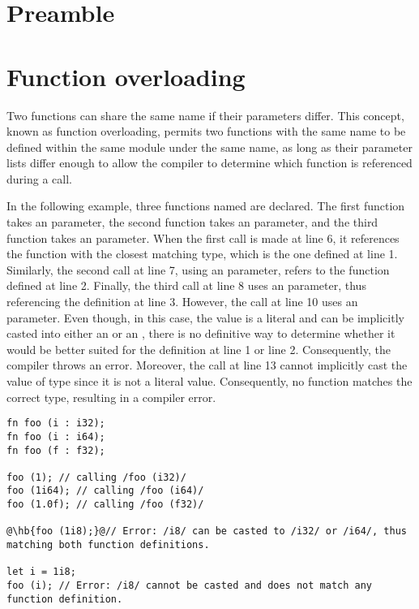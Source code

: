 \section{Preamble}

\section{Function overloading}
\label{sec:function_overloading}

Two functions can share the same name if their parameters differ. This concept,
known as function overloading, permits two functions with the same name to be
defined within the same module under the same name, as long as their parameter
lists differ enough to allow the compiler to determine which function is
referenced during a call.

In the following example, three functions named  are declared. The
first function takes an  parameter, the second function takes an
 parameter, and the third function takes an  parameter.
When the first call is made at line 6, it references the function with the
closest matching type, which is the one defined at line 1. Similarly, the second
call at line 7, using an  parameter, refers to the function defined
at line 2. Finally, the third call at line 8 uses an  parameter, thus
referencing the definition at line 3. However, the call at line 10 uses an
 parameter. Even though, in this case, the value is a literal and can
be implicitly casted into either an  or an , there is no
definitive way to determine whether it would be better suited for the definition
at line 1 or line 2. Consequently, the compiler throws an error. Moreover, the
call at line 13 cannot implicitly cast the value of type  since it is
not a literal value. Consequently, no function matches the correct type,
resulting in a compiler error.

\begin{lstlisting}[style=coloredverbatim, escapechar=@]
fn foo (i : i32);
fn foo (i : i64);
fn foo (f : f32);

foo (1); // calling /foo (i32)/
foo (1i64); // calling /foo (i64)/
foo (1.0f); // calling /foo (f32)/

@\hb{foo (1i8);}@// Error: /i8/ can be casted to /i32/ or /i64/, thus matching both function definitions.

let i = 1i8;
foo (i); // Error: /i8/ cannot be casted and does not match any function definition.
\end{lstlisting}

